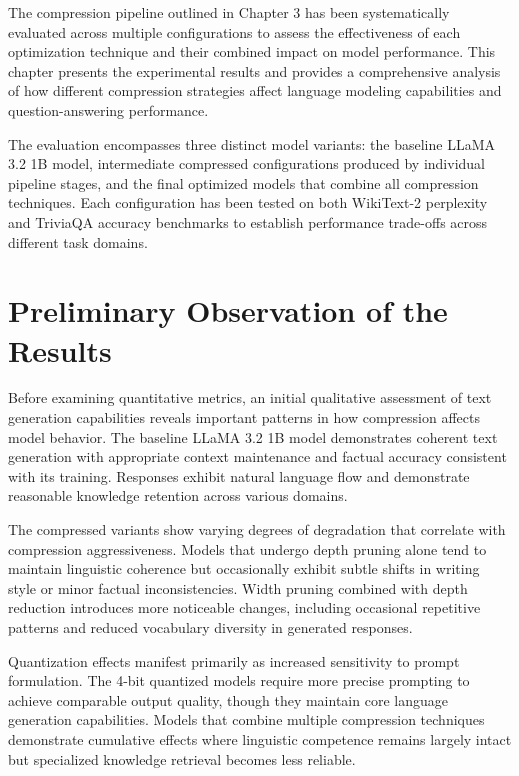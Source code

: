 The compression pipeline outlined in Chapter 3 has been systematically evaluated across multiple configurations to assess the effectiveness of each optimization technique and their combined impact on model performance. This chapter presents the experimental results and provides a comprehensive analysis of how different compression strategies affect language modeling capabilities and question-answering performance.

The evaluation encompasses three distinct model variants: the baseline LLaMA 3.2 1B model, intermediate compressed configurations produced by individual pipeline stages, and the final optimized models that combine all compression techniques. Each configuration has been tested on both WikiText-2 perplexity and TriviaQA accuracy benchmarks to establish performance trade-offs across different task domains.

\section{Preliminary Observation of the Results}

Before examining quantitative metrics, an initial qualitative assessment of text generation capabilities reveals important patterns in how compression affects model behavior. The baseline LLaMA 3.2 1B model demonstrates coherent text generation with appropriate context maintenance and factual accuracy consistent with its training. Responses exhibit natural language flow and demonstrate reasonable knowledge retention across various domains.

The compressed variants show varying degrees of degradation that correlate with compression aggressiveness. Models that undergo depth pruning alone tend to maintain linguistic coherence but occasionally exhibit subtle shifts in writing style or minor factual inconsistencies. Width pruning combined with depth reduction introduces more noticeable changes, including occasional repetitive patterns and reduced vocabulary diversity in generated responses.

Quantization effects manifest primarily as increased sensitivity to prompt formulation. The 4-bit quantized models require more precise prompting to achieve comparable output quality, though they maintain core language generation capabilities. Models that combine multiple compression techniques demonstrate cumulative effects where linguistic competence remains largely intact but specialized knowledge retrieval becomes less reliable.

